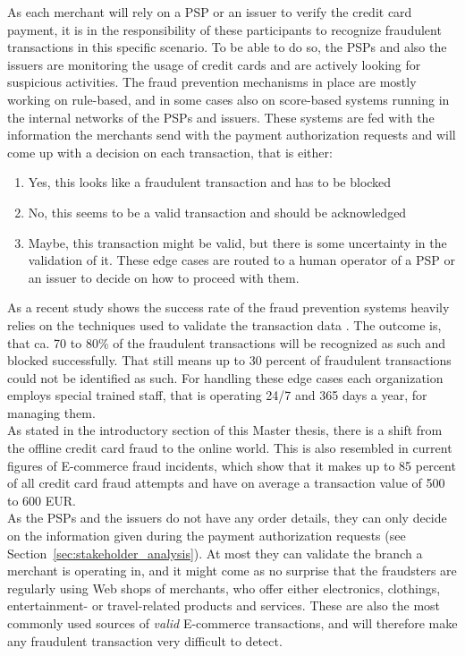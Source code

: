 As each merchant will rely on a \gls{PSP} or an issuer to verify the credit card payment, it is in the responsibility of these participants to recognize fraudulent transactions in this specific scenario. To be able to do so, the \gls{PSP}s and also the issuers are monitoring the usage of credit cards and are actively looking for suspicious activities. The fraud prevention mechanisms in place are mostly working on rule-based, and in some cases also on score-based systems running in the internal networks of the \gls{PSP}s and issuers. These systems are fed with the information the merchants send with the payment authorization requests and will come up with a decision on each transaction, that is either:\@

\begin{enumerate}
  \item Yes, this looks like a fraudulent transaction and has to be blocked
  \item No, this seems to be a valid transaction and should be acknowledged
  \item Maybe, this transaction might be valid, but there is some uncertainty in the validation of it. These edge cases are routed to a human operator of a \gls{PSP} or an issuer to decide on how to proceed with them.
\end{enumerate}

As a recent study shows the success rate of the fraud prevention systems heavily relies on the techniques used to validate the transaction data \citep{rana2015survey}. The outcome is, that ca. 70 to 80\% of the fraudulent transactions will be recognized as such and blocked successfully. That still means up to 30 percent of fraudulent transactions could not be identified as such. For handling these edge cases each organization employs special trained staff, that is operating 24/7 and 365 days a year, for managing them. \\

As stated in the introductory section of this Master thesis, there is a shift from the offline credit card fraud to the online world. This is also resembled in current figures of \gls{E-commerce} fraud incidents, which show that it makes up to 85 percent of all credit card fraud attempts and have on average a transaction value of 500 to 600 EUR.\\

As the \gls{PSP}s and the issuers do not have any order details, they can only decide on the information given during the payment authorization requests (see Section~\ref{sec:stakeholder_analysis}). At most they can validate the branch a merchant is operating in, and it might come as no surprise that the fraudsters are regularly using Web shops of merchants, who offer either electronics, clothings, entertainment- or travel-related products and services. These are also the most commonly used sources of \emph{valid} \gls{E-commerce} transactions, and will therefore make any fraudulent transaction very difficult to detect. \\

